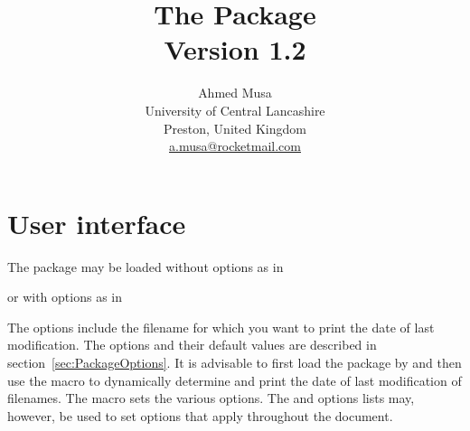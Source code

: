 \documentclass[a4paper,11pt,final]{article}
\date{\TC{purple}{\today}\vadjust{\kern2ex\hrule}}
\newcommand*\email[1]{\href{mailto:#1}{#1}}
\begin{document}
\MakeShortVerb{\+}
\title{{\bfseries The  Package}\\[1ex]
Version 1.2}
\author{Ahmed Musa\\[.5ex]University of Central Lancashire\\
  Preston, United Kingdom\\[1ex]\email{a.musa@rocketmail.com}
}
\maketitle

\columnseprule=0.5pt\premulticols=2cm
\begin{multicols}{2}
  \small\tableofcontents\normalsize
\end{multicols}
\bigskip

\begin{center}
\end{center}

\section{User interface}
The package may be loaded without options as in
\begin{gfdverbatim}
\usepackage{getfiledate}
\end{gfdverbatim}
or with options as in
\begin{gfdverbatim}
\usepackage[option=value]{getfiledate}
\end{gfdverbatim}
The options include the filename for which you want to print the date of last modification. The options and their default values are described in section~\ref{sec:PackageOptions}. It is advisable to first load the package by  and then use the macro \cmda{\getfiledate} to dynamically determine and print the date of last modification of filenames. The \cmda{\getfiledate} macro sets the various options. The \cmdb{\documentclass} and  options lists may, however, be used to set options that apply throughout the document.
\end{document}
